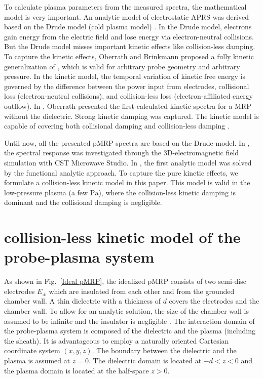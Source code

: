\documentclass[superscriptaddress,preprint]{revtex4}  %
\begin{document}
To calculate plasma parameters from the measured spectra, the mathematical model is very important. An analytic model of electrostatic APRS was derived based on the Drude model (cold plasma model) \cite{Lapke2013}. In the Drude model, electrons gain energy from the electric field and lose energy via electron-neutral collisions. But the Drude model misses important kinetic effects like collision-less damping. To capture the kinetic effects, Oberrath and Brinkmann \cite{Oberrath2014-1} proposed a fully kinetic generalization of \cite{Lapke2013}, which is valid for arbitrary probe geometry and arbitrary pressure. In the kinetic model, the temporal variation of kinetic free energy is governed by the difference between the power input from electrodes, collisional loss (electron-neutral collisions), and collision-less loss (electron-affiliated energy outflow). In \cite{Oberrath2020}, Oberrath presented the first calculated kinetic spectra for a MRP without the dielectric. Strong kinetic damping was captured. The kinetic model is capable of covering both collisional damping and collision-less damping \cite{Oberrath2014-1,Oberrath2016,Oberrath2018,Oberrath2020}.  

Until now, all the presented pMRP spectra are based on the Drude model. In \cite{Schulz2014-2,Schulz2014-3,Pohle2018}, the spectral response was investigated through the 3D-electromagnetic field simulation with CST Microwave Studio. In \cite{Friedrichs2018}, the first analytic model was solved by the functional analytic approach. To capture the pure kinetic effects, we formulate a collision-less kinetic model in this paper. This model is valid in the low-pressure plasma (a few $\mathrm{Pa}$), where the collision-less kinetic damping is dominant and the collisional damping is negligible.

\pagebreak




\section{collision-less kinetic model of the probe-plasma system}
As shown in Fig.~\ref{Ideal pMRP}, the idealized pMRP consists of two semi-disc electrodes $E_\pm$ which are insulated from each other and from the grounded chamber wall. A thin dielectric with a thickness of $d$ covers the electrodes and the chamber wall. To allow for an analytic solution, the size of the chamber wall is assumed to be infinite and the insulator is negligible \cite{Friedrichs2018}. The interaction domain of the probe-plasma system is composed of the dielectric and the plasma (including the sheath). It is advantageous to employ a naturally oriented Cartesian coordinate system $(x,y,z)$. The boundary between the dielectric and the plasma is assumed at $z=0$. The dielectric domain is located at $-d<z<0$ and the plasma domain is located at the half-space $z>0$.
\end{document}
